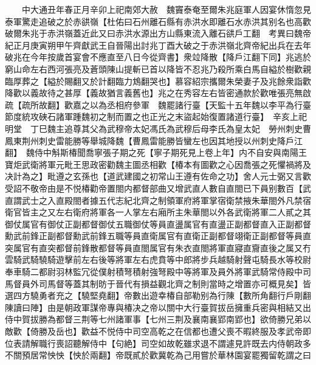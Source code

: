 　　中大通丑年春正月辛卯上祀南郊大赦　魏竇泰奄至爾朱兆庭軍人因宴休惰忽見泰軍驚走追破之於赤谼嶺【杜佑曰石州離石縣有赤洪水即離石水赤洪其别名也高歡破爾朱兆于赤洪嶺蓋近此又曰赤洪水源出方山縣東流入離石谼戶工翻　考異曰魏帝紀正月庚寅朔甲午齊獻武王自晉陽出討兆丁酉大破之于赤洪嶺北齊帝紀出兵在去年破兆在今年按歲首宴會不應直至八日今從齊書】衆竝降散【降戶江翻下同】兆逃於窮山命左右西河張亮及蒼頭陳山提斬已首以降皆不忍兆乃殺所乘白馬自縊於樹歡親臨厚葬之【縊於賜翻又於計翻臨力鴆翻哭也】慕容紹宗攜爾朱榮妻子及兆餘衆詣歡降歡以義故待之甚厚【義故猶言義舊也】兆之在秀容左右皆密通款於歡唯張亮無啟疏【疏所故翻】歡嘉之以為丞相府參軍　魏罷諸行臺【天監十五年魏以李平為行臺節度統攻硤石諸軍踵魏初之制而置之也正光之末盜起始復置諸道行臺】　辛亥上祀明堂　丁巳魏主追尊其父為武穆帝太妃馮氏為武穆后母李氏為皇太妃　勞州刺史曹鳳東荆州刺史雷能勝等舉城降魏【曹鳳雷能勝皆蠻左也因其地授以州刺史降戶江翻】　魏侍中斛斯椿聞喬寧張子期之死【寧子期死見上卷上年】内不自安與南陽王寶炬武衛將軍元毗王思政密勸魏主圖丞相歡【椿本有圖歡之心因喬張之死懼禍將及决計為之】毗遵之玄孫也【道武建國之初常山王遵有佐命之功】舍人元士弼又言歡受詔不敬帝由是不悦椿勸帝置閤内都督部曲又增武直人數自直閤已下員别數百【武直謂武士之入直殿閤者據五代志紀北齊之制領軍府將軍掌宿衛禁掖朱華閤外凡禁宿衛官皆主之又左右衛府將軍各一人掌左右廂所主朱華閤以外各武衛將軍二人貳之其御仗属官有御仗正副都督御仗五職御仗等員直盪属官有直盪正副都督直入正副都督勳武前鋒正副都督勳武前鋒五職等員直衛属官有直衛正副都督翊衛正副都督等員直突属官有直突都督前鋒散都督等員直閤属官有朱衣直閤將軍直寢直齎直後之属又冇雲騎武騎驍騎遊擊前左右後等將軍左右虎賁等中郎將步兵越騎射聲屯騎長水等校尉奉車騎二都尉羽林監冗從僕射積弩積射強弩殿中等將軍及員外將軍武騎常侍殿中司馬督員外司馬督等蓋其制昉于晉代有損益觀北齊之制則當時之增置亦可概見矣】皆選四方驍勇者充之【驍堅堯翻】帝數出遊幸椿自部勒别為行陳【數所角翻行戶剛翻陳讀曰陣】由是朝政軍謀帝專與椿决之帝以關中大行臺賀拔岳擁重兵密與相結又出侍中賀拔勝為都督三荆等七州諸軍事【七州三荆及襄南襄郢南郢也】欲倚勝兄弟以敵歡【倚勝及岳也】歡益不悦侍中司空高乾之在信都也遭父喪不暇終服及孝武帝即位表請解職行喪詔聽解侍中【句絶】司空如故乾雖求退不謂遽見許既去内侍朝政多不關預居常怏怏【怏於兩翻】帝既貳於歡冀乾為己用嘗於華林園宴罷獨留乾謂之曰

